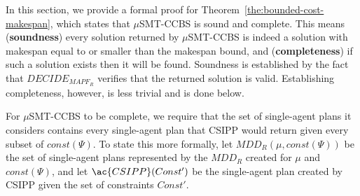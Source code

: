 \documentclass[review]{elsarticle}
\newcommand{\mddr}{\ensuremath{MDD_R}\xspace}
\newcommand{\decidemapfr}{\ensuremath{\mathit{DECIDE_{MAPF_R}}}\xspace}
\newcommand\konstantin[1]{\nb{\textbf{Konstantin:}}{red}{#1}}
\newcommand\roni[1]{\nb{\textbf{Roni:}}{green}{#1}}
\newcommand{\csipp}{\ac{CSIPP}\xspace}
\newcommand{\musmtccbs}{\ensuremath{\mu}SMT-CCBS\xspace}
\newcommand{\const}{\textit{const}\xspace}
\begin{document}
In this section, we provide a formal proof for Theorem~\ref{the:bounded-cost-makespan}, which states that \musmtccbs is sound and complete. 
This means (\textbf{soundness}) every solution returned by \musmtccbs is indeed a solution with makespan equal to or smaller than the makespan bound, 
and (\textbf{completeness}) if such a solution exists then it will be found. 
Soundness is established by the fact that \decidemapfr verifies that the returned solution is valid. 
Establishing completeness, however, is less trivial and is done below. 



For \musmtccbs to be complete,
we require that the set of single-agent plans it considers contains every single-agent plan that \csipp would return given every subset of $\const(\Psi)$. 
To state this more formally, let $\mddr(\mu, \const(\Psi))$ be the set of single-agent plans represented by the \mddr created for $\mu$ and $\const(\Psi)$, and let $\csipp(Const')$ be the single-agent plan created by \csipp given the set of constraints $Const'$. 
\end{document}
